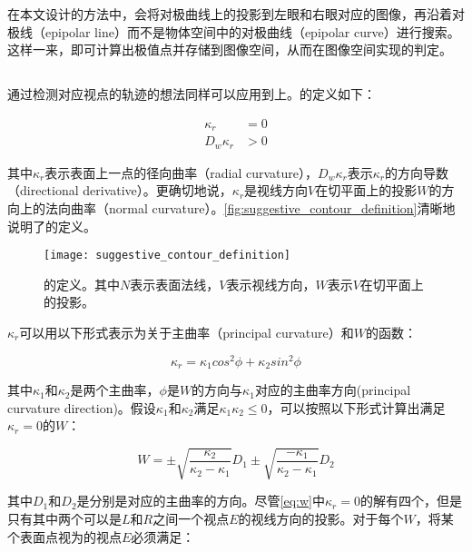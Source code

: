 在本文设计的方法中，会将对极曲线上的\conp{}投影到左眼和右眼对应的图像，再沿着对极线（epipolar line）而不是物体空间中的对极曲线（epipolar curve）进行搜索。这样一来，即可计算出极值点并存储到图像空间，从而在图像空间实现\epsl{}的判定。

\subsection{\scon{}}
\label{sec:suggestive_contour_math}
通过检测对应视点的轨迹的想法同样可以应用到\scon{}上。\scon{}的定义如下：

\begin{align}
  \kappa_r &= 0 \label{eq:Kr} \\
  D_w\kappa_r &> 0 \label{eq:DwKr} 
\end{align}

其中$\kappa_r$表示表面上一点的径向曲率（radial curvature），$D_w\kappa_r$表示$\kappa_r$的方向导数（directional derivative）。更确切地说，$\kappa_r$是视线方向$V$在切平面上的投影$W$的方向上的法向曲率（normal curvature）。\autoref{fig:suggestive_contour_definition}清晰地说明了\scon{}的定义。

\begin{figure}[!t]
    \centering
    \texttt{[image: suggestive\_contour\_definition]}
    \caption{\label{fig:suggestive_contour_definition}
    \scon{}的定义。其中$N$表示表面法线，$V$表示视线方向，$W$表示$V$在切平面上的投影。}
\end{figure}

$\kappa_r$可以用以下形式表示为关于主曲率（principal curvature）和$W$的函数：

\begin{equation}\label{eq:normal curvature}
    \kappa_r = \kappa_1cos^2\phi+\kappa_2sin^2\phi
\end{equation}

其中$\kappa_1$和$\kappa_2$是两个主曲率，$\phi$是$W$的方向与$\kappa_1$对应的主曲率方向(principal curvature direction)。假设$\kappa_1$和$\kappa_2$满足$\kappa_1\kappa_2 \leq 0$，可以按照以下形式计算出满足$\kappa_r = 0$的$W$：

\begin{equation}\label{eq:w}
    W = \pm\sqrt{\frac{\kappa_2}{\kappa_2-\kappa_1}}D_1\pm\sqrt{\frac{-\kappa_1}{\kappa_2-\kappa_1}}D_2
\end{equation}

其中$D_1$和$D_2$是分别是对应的主曲率的方向。尽管\autoref{eq:w}中$\kappa_r = 0$的解有四个，但是只有其中两个可以是$L$和$R$之间一个视点$E$的视线方向的投影。对于每个$W$，将某个表面点视为\sconp{}的视点$E$必须满足：


